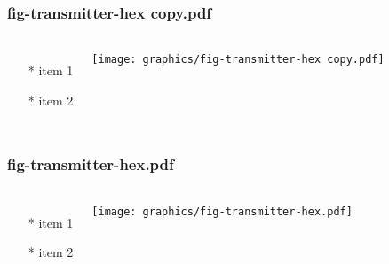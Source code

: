 \begin{frame} \frametitle{fig-transmitter-hex copy.pdf}
    \begin{columns}[c]
        \begin{itemize}
            \item[*] item 1
            \item[*] item 2
        \end{itemize}
        \begin{minipage}{\linewidth}
            \begin{center}
            \texttt{[image: graphics/fig-transmitter-hex copy.pdf]}
            \label{gfx:fig-transmitter-hex copy.pdf}
            \end{center}
        \end{minipage}
    \end{columns}
\end{frame}
\begin{frame} \frametitle{fig-transmitter-hex.pdf}
    \begin{columns}[c]
        \begin{itemize}
            \item[*] item 1
            \item[*] item 2
        \end{itemize}
        \begin{minipage}{\linewidth}
            \begin{center}
            \texttt{[image: graphics/fig-transmitter-hex.pdf]}
            \label{gfx:fig-transmitter-hex.pdf}
            \end{center}
        \end{minipage}
    \end{columns}
\end{frame}
